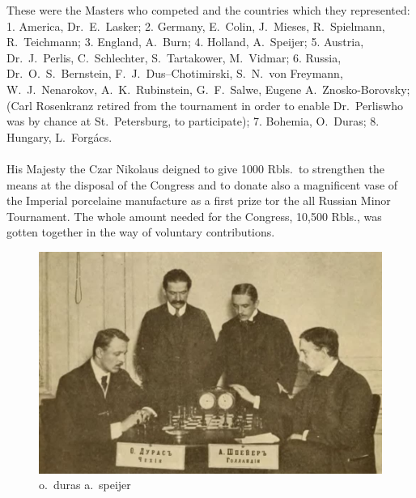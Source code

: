 These were the Masters who competed and the countries which they represented: 1. America, Dr.~E.~Lasker; 2. Germany, E.~Colin, J.~Mieses, R.~Spielmann, R.~Teichmann; 3. England, A.~Burn; 4. Holland, A.~Speijer; 5. Austria, Dr.~J.~Perlis, C.~Schlechter, S.~Tartakower, M.~Vidmar; 6. Russia, Dr.~O.~S.~Bernstein, F.~J.~Dus--Chotimirski, S.~N.~von Freymann, W.~J.~Nenarokov, A.~K.~Rubinstein, G.~F.~Salwe, Eugene A.~Znosko-Borovsky; (Carl Rosenkranz retired from the tournament in order to enable Dr.~Perliswho was by chance at St.~Petersburg, to participate); 7. Bohemia, O.~Duras; 8. Hungary, L.~Forg\'acs.\\
\vspace{0.2cm}\\
His Majesty the Czar Nikolaus deigned to give 1000 Rbls.~to strengthen the means at the disposal of the Congress and to donate also a magnificent vase of the Imperial porcelaine manufacture as a first prize tor the all Russian Minor Tournament. The whole amount needed for the Congress, 10,500 Rbls., was gotten together in the way of voluntary contributions.

\begin{figure}[h]
\centering
\includegraphics[width=\textwidth]
{img/i7_duras-speijer.jpg}\\
\small\sc
o.~duras \hspace{5cm} a.~speijer
\end{figure}
